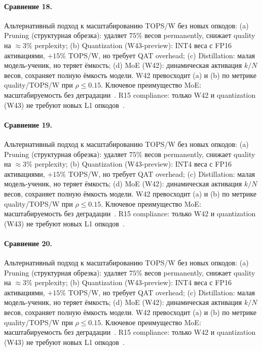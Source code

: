 \paragraph{Сравнение 18.} Альтернативный подход к масштабированию TOPS/W без новых опкодов: (a) Pruning (структурная обрезка): удаляет $75\%$ весов permanently, снижает quality на $\approx 3\%$ perplexity; (b) Quantization (W43-preview): INT4 веса с FP16 активациями, $+15\%$ TOPS/W, но требует QAT overhead; (c) Distillation: малая модель-ученик, но теряет ёмкость; (d) MoE (W42): динамическая активация $k/N$ весов, сохраняет полную ёмкость модели. W42 превосходит (a) и (b) по метрике quality/TOPS/W при $\rho \leq 0{.}15$. Ключевое преимущество MoE: масштабируемость без деградации~\cite{switch_transformer2021,mixtral2024}. R15 compliance: только W42 и quantization (W43) не требуют новых L1 опкодов~\cite{lee_gvsu_proof2021}.

\paragraph{Сравнение 19.} Альтернативный подход к масштабированию TOPS/W без новых опкодов: (a) Pruning (структурная обрезка): удаляет $75\%$ весов permanently, снижает quality на $\approx 3\%$ perplexity; (b) Quantization (W43-preview): INT4 веса с FP16 активациями, $+15\%$ TOPS/W, но требует QAT overhead; (c) Distillation: малая модель-ученик, но теряет ёмкость; (d) MoE (W42): динамическая активация $k/N$ весов, сохраняет полную ёмкость модели. W42 превосходит (a) и (b) по метрике quality/TOPS/W при $\rho \leq 0{.}15$. Ключевое преимущество MoE: масштабируемость без деградации~\cite{switch_transformer2021,mixtral2024}. R15 compliance: только W42 и quantization (W43) не требуют новых L1 опкодов~\cite{lee_gvsu_proof2021}.

\paragraph{Сравнение 20.} Альтернативный подход к масштабированию TOPS/W без новых опкодов: (a) Pruning (структурная обрезка): удаляет $75\%$ весов permanently, снижает quality на $\approx 3\%$ perplexity; (b) Quantization (W43-preview): INT4 веса с FP16 активациями, $+15\%$ TOPS/W, но требует QAT overhead; (c) Distillation: малая модель-ученик, но теряет ёмкость; (d) MoE (W42): динамическая активация $k/N$ весов, сохраняет полную ёмкость модели. W42 превосходит (a) и (b) по метрике quality/TOPS/W при $\rho \leq 0{.}15$. Ключевое преимущество MoE: масштабируемость без деградации~\cite{switch_transformer2021,mixtral2024}. R15 compliance: только W42 и quantization (W43) не требуют новых L1 опкодов~\cite{lee_gvsu_proof2021}.

